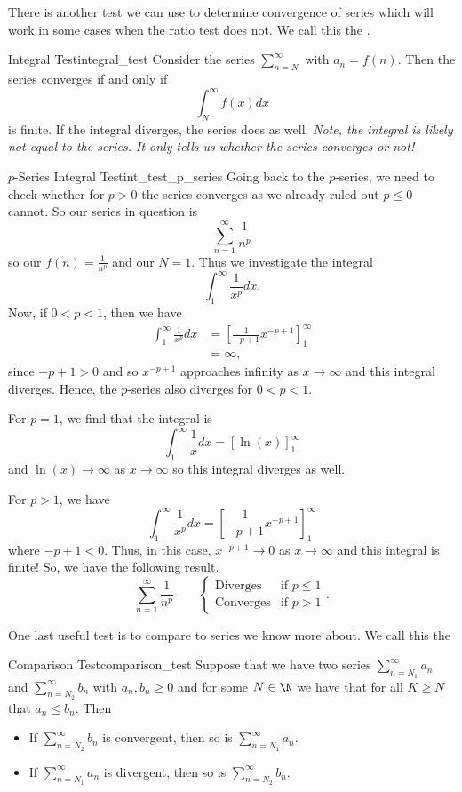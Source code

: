 There is another test we can use to determine convergence of series which will work in some cases when the ratio test does not. We call this the .

\begin{prop}{Integral Test}{integral_test}
Consider the series $\sum_{n=N}^\infty$ with $a_n=f(n)$.  Then the series converges if and only if
\[
\int_{N}^\infty f(x)dx
\]
is finite. If the integral diverges, the series does as well. \emph{Note, the integral is likely not equal to the series. It only tells us whether the series converges or not!}
\end{prop}

\begin{ex}{$p$-Series Integral Test}{int_test_p_series}
Going back to the $p$-series, we need to check whether for $p>0$ the series converges as we already ruled out $p\leq 0$ cannot.  So our series in question is
\[
\sum_{n=1}^\infty \frac{1}{n^p}
\]
so our $f(n)=\frac{1}{n^p}$ and our $N=1$.  Thus we investigate the integral
\[
\int_1^\infty \frac{1}{x^p}dx.
\]
Now, if $0<p<1$, then we have
\begin{align*}
    \int_1^\infty \frac{1}{x^p}dx &= \left[\frac{1}{-p+1} x^{-p+1} \right]_1^\infty\\
    &= \infty,
\end{align*}
since $-p+1>0$ and so $x^{-p+1}$ approaches infinity as $x\to \infty$ and this integral diverges.  Hence, the $p$-series also diverges for $0<p<1$. 

For $p=1$, we find that the integral is
\[
\int_1^\infty \frac{1}{x} dx = \left[ \ln(x) \right]_1^\infty
\]
and $\ln(x)\to \infty$ as $x\to \infty$ so this integral diverges as well.  

For $p>1$, we have
\[
\int_1^\infty \frac{1}{x^p}dx = \left[ \frac{1}{-p+1}x^{-p+1}\right]_1^\infty
\]
where $-p+1<0$. Thus, in this case, $x^{-p+1}\to 0$ as $x\to \infty$ and this integral is finite!  So, we have the following result.
\[
\sum_{n=1}^\infty \frac{1}{n^p} \qquad \begin{cases} \textrm{Diverges} & \textrm{if $p\leq 1$} \\
\textrm{Converges} & \textrm{if $p>1$}\end{cases}.
\]
\end{ex}

One last useful test is to compare to series we know more about. We call this the 

\begin{prop}{Comparison Test}{comparison_test}
Suppose that we have two series $\sum_{n=N_1}^\infty a_n$ and $\sum_{n=N_2}^\infty b_n$ with $a_n,b_n\geq 0$ and for some $N \in \N$ we have that for all $K\geq N$ that $a_n\leq b_n$. Then
\begin{itemize}
    \item If $\sum_{n=N_2}^\infty b_n$ is convergent, then so is $\sum_{n=N_1}^\infty a_n$.
    \item If $\sum_{n=N_1}^\infty a_n$ is divergent, then so is $\sum_{n=N_2}^\infty b_n$.
\end{itemize}
\end{prop}
